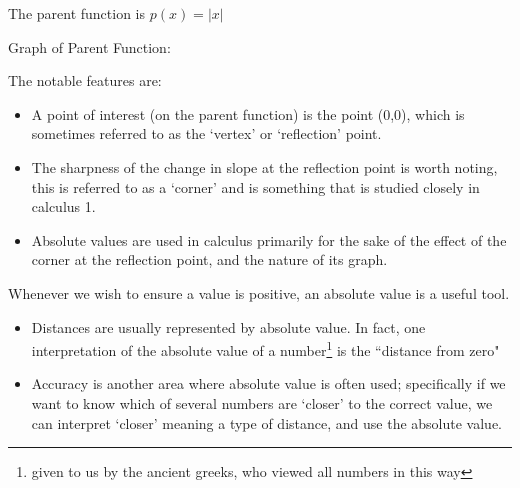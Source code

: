\documentclass{ximera}
\begin{document}
        \begin{description}
            \item[Parent Function:] The parent function is $p(x) = |x|$\\
            \begin{minipage}{\textwidth}\item[Graph of Parent Function:]\hspace*{0pt} \\
                \begin{center}
                \end{center}
            \end{minipage}
            \item[Notable Features of Graph:] The notable features are:
            \begin{itemize}
                \item A point of interest (on the parent function) is the point (0,0), which is sometimes referred to as the `vertex' or `reflection' point.
                \item The sharpness of the change in slope at the reflection point is worth noting, this is referred to as a `corner' and is something that is studied closely in calculus 1.
                \item Absolute values are used in calculus primarily for the sake of the effect of the corner at the reflection point, and the nature of its graph.
            \end{itemize}
            \item[Example usage:] Whenever we wish to ensure a value is positive, an absolute value is a useful tool.
            \begin{itemize}
                \item Distances are usually represented by absolute value. In fact, one interpretation of the absolute value of a number\footnote{given to us by the ancient greeks, who viewed all numbers in this way} is the ``distance from zero"
                \item Accuracy is another area where absolute value is often used; specifically if we want to know which of several numbers are `closer' to the correct value, we can interpret `closer' meaning a type of distance, and use the absolute value.
            \end{itemize}
        \end{description}
        
\end{document}
